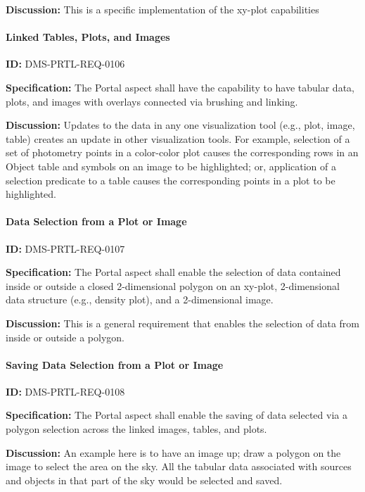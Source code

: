 \documentclass[SE,toc,lsstdraft]{lsstdoc}
\begin{document}
\textbf{Discussion:}
This is a specific implementation of the xy-plot capabilities

\paragraph{Linked Tables, Plots, and Images}\hfill  %

\label{DMS-PRTL-REQ-0106}
\textbf{ID:} DMS-PRTL-REQ-0106

\textbf{Specification:}
The Portal aspect shall have the capability to have tabular data, plots, and images with overlays connected via brushing and linking.

\textbf{Discussion:}
Updates to the data in any one visualization tool (e.g., plot, image, table) creates an update in other visualization tools.  For example, selection of a set of photometry points in a color-color plot causes the corresponding rows in an Object table and symbols on an image to be highlighted; or, application of a selection predicate to a table causes the corresponding points in a plot to be highlighted.

\paragraph{Data Selection from a Plot or Image}\hfill  %

\label{DMS-PRTL-REQ-0107}
\textbf{ID:} DMS-PRTL-REQ-0107

\textbf{Specification:}
The Portal aspect shall enable the selection of data contained inside or outside a closed 2-dimensional polygon on an xy-plot, 2-dimensional data structure (e.g., density plot), and a 2-dimensional image.

\textbf{Discussion:}
This is a general requirement that enables the selection of data from inside or outside a polygon.

\paragraph{Saving Data Selection from a Plot or Image}\hfill  %

\label{DMS-PRTL-REQ-0108}
\textbf{ID:} DMS-PRTL-REQ-0108

\textbf{Specification:}
The Portal aspect shall enable the saving of data selected via a polygon selection across the linked images, tables, and plots.

\textbf{Discussion:}
An example here is to have an image up; draw a polygon on the image to select the area on the sky.  All the tabular data associated with sources and objects in that part of the sky would be selected and saved.
\end{document}

